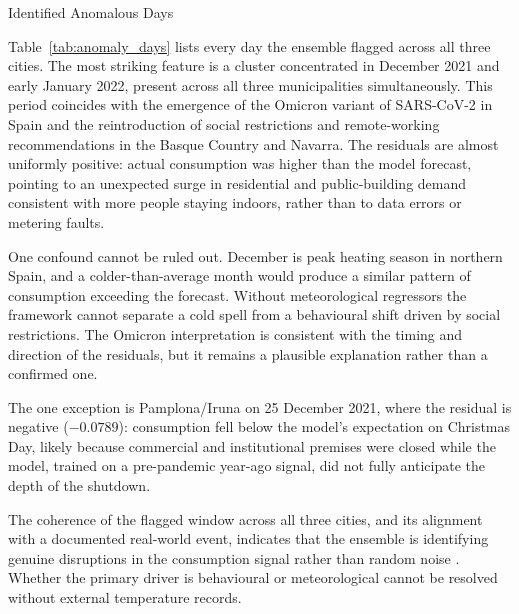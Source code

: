 ﻿\documentclass[12pt,reqno, twoside]{amsbook}
\makeatletter
\numberwithin{figure}{chapter}
\numberwithin{table}{chapter}
\numberwithin{equation}{chapter}
\def\subsection{\@startsection{subsection}{2}%
      \z@{.5\linespacing\@plus.7\linespacing}{.25\linespacing}%
      {\normalfont\bfseries\flushleft}}
\theoremstyle{plain}
\numberwithin{equation}{chapter}
\numberwithin{section}{chapter}
\makeatother
\begin{document}
\subsection{Identified Anomalous Days}

Table~\ref{tab:anomaly_days} lists every day the ensemble flagged across all three cities. The most striking feature is a cluster concentrated in December 2021 and early January 2022, present across all three municipalities simultaneously. This period coincides with the emergence of the Omicron variant of SARS-CoV-2 in Spain and the reintroduction of social restrictions and remote-working recommendations in the Basque Country and Navarra. The residuals are almost uniformly positive: actual consumption was higher than the model forecast, pointing to an unexpected surge in residential and public-building demand consistent with more people staying indoors, rather than to data errors or metering faults.

One confound cannot be ruled out. December is peak heating season in northern Spain, and a colder-than-average month would produce a similar pattern of consumption exceeding the forecast. Without meteorological regressors the framework cannot separate a cold spell from a behavioural shift driven by social restrictions. The Omicron interpretation is consistent with the timing and direction of the residuals, but it remains a plausible explanation rather than a confirmed one.

The one exception is Pamplona/Iruna on 25 December 2021, where the residual is negative ($-0.0789$): consumption fell below the model's expectation on Christmas Day, likely because commercial and institutional premises were closed while the model, trained on a pre-pandemic year-ago signal, did not fully anticipate the depth of the shutdown.

The coherence of the flagged window across all three cities, and its alignment with a documented real-world event, indicates that the ensemble is identifying genuine disruptions in the consumption signal rather than random noise \cite{zangrando_anomaly_2022, gaur_performance_2019}. Whether the primary driver is behavioural or meteorological cannot be resolved without external temperature records.
\end{document}
